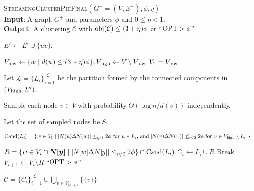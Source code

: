 \begin{algorithm}[H]
\caption{{\textsc{StreamingClusterPhiFinal}}$(G^+=(V, E^+), \phi, \eta)$\label{alg:streamingfinal}\\
\textbf{Input}: A graph $G^{+}$ and parameters $\phi$ and $0 \leq \eta < 1$. \\
\textbf{Output}: A clustering $\mathcal{C}$ with $\mathrm{obj}(\mathcal{C})\leq (3+\eta)\phi$ or ``$\mathrm{OPT} > \phi$''}
\label{alg:streamingcpfinal}
\begin{algorithmic}[1]

     
            \State $E' \leftarrow E' \cup \{uv\}$.
        \EndIf
    \EndFor

    \State $V_{\operatorname{low}} \leftarrow \{w \mid \mbox{$d(w) \leq (3+\eta) \phi$} \}, V_{\operatorname{high}} \leftarrow V \setminus V_{\operatorname{low}}$
    \State $V_1 = V_{\operatorname{low}}$

    \State Let $\mathcal{L} = \{L_i\}_{i=1}^{|\mathcal{L}|}$ be the partition formed by the connected components in $(V_{\operatorname{high}} ,E')$.
        
    \begin{tcolorbox}
    
    \State Sample each node $v \in V$ with probability $\Theta(\log n / d(v))$ independently.
    
    \State Let the set of sampled nodes be $S$.

    \end{tcolorbox}

     \label{ln:streamingfinalupper}
    \State \label{ln:streamingfinalstart} $\mathrm{Cand}(L_i) = \{ w \in V_1 \mid |N(u) \Delta N(w) | \leq_{\eta/2} 2\phi \text{ for $u \in L_i$, and } |N(v) \Delta N(w) | \not\leq_{\eta/2} 2\phi \text{ for $v \in V_{\operatorname{high}} \setminus L_i$ }\}$
    \begin{tcolorbox}

    \State \label{ln:streamingfinalend} $R = \{ w \in V_i \cap \bm{N[y]} \mid |N[w] \Delta N[y]|  \leq_{\eta/2} 2\phi  \} \cap \mathrm{Cand}(L_i)$
    \State  \label{ln:streamingfinalc}$C_i \leftarrow L_i \cup R$
        \State Break
    \EndIf
    \EndFor
        \State $V_{i + 1} \leftarrow V_i \setminus R$
    \Else
        \State \Return ``$\mathrm{OPT} > \phi$''
    \label{ln:streamingfinalend2} \EndIf
    \end{tcolorbox}
    
    \EndFor   \label{ln:streamingfinallower}
\State \Return $\mathcal{C} = \{C_i\}_{i=1}^{|\mathcal{L}|} \cup \bigcup_{v \in V_{|\mathcal{L}|+1}}\{ \{v\} \}$

\EndFunction
\end{algorithmic}
\end{algorithm}




